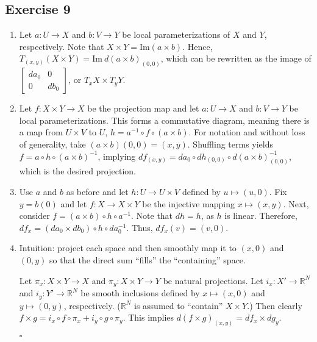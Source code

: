 \documentclass{article}
\newcommand{\R}{\mathbb{R}}
\begin{document}
\subsection*{Exercise 9}
  \begin{enumerate}[label=(\arabic*)]
    \item{
      Let $a\colon U\to X$ and $b\colon V\to Y$ be local parameterizations of
      $X$ and $Y$, respectively. Note that $X\times Y=\text{Im}(a\times b)$.
      Hence, $T_{(x,y)}(X\times Y)=\text{Im}\ d(a\times b)_{(0,0)}$, which can
      be rewritten as the image of
      $\left[
        \begin{smallmatrix}
          da_0  & 0   \\
          0     & db_0
        \end{smallmatrix}
      \right]$, or $T_xX\times T_yY$.
    }
    \item{
      Let $f\colon X\times Y\to X$ be the projection map and let $a\colon U\to
      X$ and $b\colon V\to Y$ be local parameterizations. This forms a
      commutative diagram, meaning there is a map from $U\times V$ to $U$,
      $h=a^{-1}\circ f\circ(a\times b)$. For notation and without loss of
      generality, take $(a\times b)(0,0)=(x,y)$. Shuffling terms yields $f=a
      \circ h \circ(a\times b)^{-1}$, implying $df_{(x,y)}=da_0\circ dh_{(0,0)}
      \circ d(a\times b)^{-1}_{(0,0)}$, which is the desired projection.
    }
    \item{
      Use $a$ and $b$ as before and let $h\colon U\to U\times V$ defined by $u
      \mapsto(u,0)$. Fix $y=b(0)$ and let $f\colon X\to X\times Y$ be the
      injective mapping $x\mapsto(x,y)$. Next, consider $f=(a\times b)\circ h
      \circ a^{-1}$. Note that $dh=h$, as $h$ is linear. Therefore, $df_x=
      (da_0\times db_0)\circ h\circ da^{-1}_0$. Thus, $df_x(v)=(v,0)$.
    }
    \item{
      Intuition: project each space and then smoothly map it to $(x,0)$ and
      $(0,y)$ so that the direct sum ``fills'' the ``containing'' space.

      Let $\pi_x\colon X\times Y\to X$ and $\pi_y\colon X\times Y\to Y$ be
      natural projections. Let $i_x\colon X'\to\R^N$ and $i_y\colon Y'\to\R^N$
      be smooth inclusions defined by $x\mapsto(x,0)$ and $y\mapsto(0,y)$,
      respectively. ($\R^N$ is assumed to ``contain'' $X\times Y$.) Then clearly
      $f\times g=i_x\circ f\circ\pi_x+i_y\circ g\circ\pi_y$. This implies
      $d(f\times g)_{(x,y)}=df_x\times dg_y$.
    }
    \hfill $\square$
  \end{enumerate}
\end{document}
